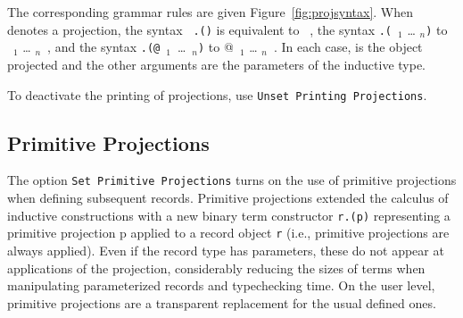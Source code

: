 The corresponding grammar rules are given Figure~\ref{fig:projsyntax}.
When {\qualid} denotes a projection, the syntax {\tt
  {\term}.({\qualid})} is equivalent to {\qualid~\term}, the syntax
{\term}{\tt .(}{\qualid}~{\termarg}$_1$ {\ldots} {\termarg}$_n${\tt )} to
{\qualid~{\termarg}$_1$ {\ldots} {\termarg}$_n$~\term}, and the syntax
{\term}{\tt .(@}{\qualid}~{\term}$_1$~\ldots~{\term}$_n${\tt )} to
{@\qualid~{\term}$_1$ {\ldots} {\term}$_n$~\term}. In each case, {\term}
is the object projected and the other arguments are the parameters of
the inductive type.

To deactivate the printing of projections, use 
{\tt Unset Printing Projections}.

\subsection{Primitive Projections}
\label{prim-proj}

The option {\tt Set Primitive Projections} turns on the use of primitive
projections when defining subsequent records. Primitive projections
extended the calculus of inductive constructions with a new binary term
constructor {\tt r.(p)} representing a primitive projection p applied to
a record object {\tt r} (i.e., primitive projections are always
applied). Even if the record type has parameters, these do not appear at
applications of the projection, considerably reducing the sizes of terms
when manipulating parameterized records and typechecking time. On the
user level, primitive projections are a transparent replacement
for the usual defined ones.



